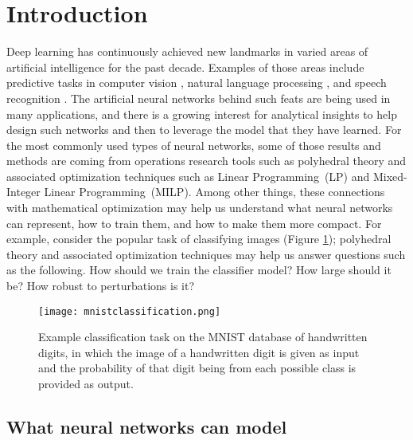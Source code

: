 

\section{Introduction}
\label{sec:intro}
Deep learning has continuously achieved new landmarks in varied areas of artificial intelligence for the past decade. Examples of those areas include predictive tasks in computer vision \citep{Krizhevsky2012,Ciresan2012,Szegedy2015,He2016DeepRL,NoisyStudent}, natural language processing \citep{sutskever2014sequence,ELMo,GPT,BERT}, and speech recognition \citep{Hinton2012,EndToEndSpeech,SpecAugment}. 
The artificial neural networks behind such feats are being used in many applications, 
and there is a growing interest for analytical insights to %
help design such networks and then to leverage the model that they have learned. 
For the most commonly used types of neural networks, some of those results and methods are coming from operations research tools such as polyhedral theory and associated optimization techniques such as Linear Programming~(LP) and Mixed-Integer Linear Programming~(MILP). 
Among other things, 
these connections with mathematical optimization may help us understand what neural networks can represent, how to train them, and %
how to make them more compact.
For example, consider the popular task of classifying images (Figure \ref{fig:mnist}); polyhedral theory and associated optimization techniques may help us answer questions such as the following. How should we train the classifier model? How large should it be? How robust to perturbations is it?

\begin{figure}
\centering
\texttt{[image: mnistclassification.png]}
\caption{Example classification task on the MNIST database of handwritten digits, in which the image of a handwritten digit is given as input and the probability of that digit being from each possible class is provided as output.}
\label{fig:mnist}
\end{figure}


\subsection{What neural networks can model}

